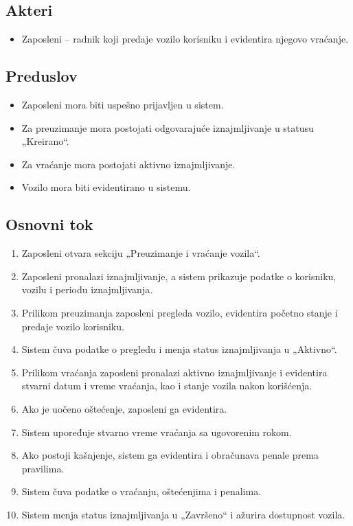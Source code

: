 \documentclass[12pt,a4paper]{article}
\begin{document}
\subsection*{Akteri}

\begin{itemize}
    \item Zaposleni -- radnik koji predaje vozilo korisniku i evidentira njegovo vraćanje.
\end{itemize}

\subsection*{Preduslov}

\begin{itemize}
    \item Zaposleni mora biti uspešno prijavljen u sistem.
    \item Za preuzimanje mora postojati odgovarajuće iznajmljivanje u statusu „Kreirano“.
    \item Za vraćanje mora postojati aktivno iznajmljivanje.
    \item Vozilo mora biti evidentirano u sistemu.
\end{itemize}

\subsection*{Osnovni tok}

\begin{enumerate}
    \item Zaposleni otvara sekciju „Preuzimanje i vraćanje vozila“.
    \item Zaposleni pronalazi iznajmljivanje, a sistem prikazuje podatke o korisniku,
    vozilu i periodu iznajmljivanja.
    \item Prilikom preuzimanja zaposleni pregleda vozilo, evidentira početno stanje
    i predaje vozilo korisniku.
    \item Sistem čuva podatke o pregledu i menja status iznajmljivanja u „Aktivno“.
    \item Prilikom vraćanja zaposleni pronalazi aktivno iznajmljivanje i evidentira
    stvarni datum i vreme vraćanja, kao i stanje vozila nakon korišćenja.
    \item Ako je uočeno oštećenje, zaposleni ga evidentira.
    \item Sistem upoređuje stvarno vreme vraćanja sa ugovorenim rokom.
    \item Ako postoji kašnjenje, sistem ga evidentira i obračunava penale prema pravilima.
    \item Sistem čuva podatke o vraćanju, oštećenjima i penalima.
    \item Sistem menja status iznajmljivanja u „Završeno“ i ažurira dostupnost vozila.
\end{enumerate}
\end{document}
